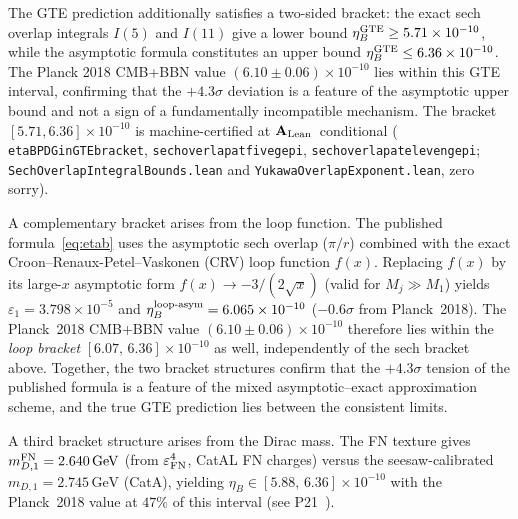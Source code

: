 \documentclass[11pt]{article}
\theoremstyle{remark}
\newcommand{\lean}[1]{%
  \penalty-100
  \begingroup\def\_{\textunderscore\allowbreak}\texttt{#1}\endgroup}
\newcommand{\CatAL}{\ensuremath{\textbf{A}_{\rm Lean}}}
\begin{document}
The GTE prediction additionally satisfies a two-sided bracket:
the exact sech overlap integrals $I(5)$ and $I(11)$ give a lower bound
$\eta_B^{\rm GTE} \geq 5.71 \times 10^{-10}$, while the asymptotic
formula constitutes an upper bound $\eta_B^{\rm GTE} \leq 6.36 \times 10^{-10}$.
The Planck 2018 CMB+BBN value $(6.10 \pm 0.06)\times 10^{-10}$ lies
within this GTE interval, confirming that the $+4.3\sigma$ deviation
is a feature of the asymptotic upper bound and not a sign of a fundamentally
incompatible mechanism.  The bracket $[5.71, 6.36] \times 10^{-10}$
is machine-certified at \CatAL\ conditional
(\lean{eta\_B\_PDG\_in\_GTE\_bracket},
\lean{sech\_overlap\_at\_five\_ge\_pi},
\lean{sech\_overlap\_at\_eleven\_ge\_pi};
\texttt{SechOverlapIntegralBounds.lean} and
\texttt{YukawaOverlapExponent.lean}, zero sorry).

A complementary bracket arises from the loop function.
The published formula~\eqref{eq:etab} uses the asymptotic sech overlap ($\pi/r$)
combined with the exact Croon--Renaux-Petel--Vaskonen (CRV) loop function $f(x)$.
Replacing $f(x)$ by its large-$x$ asymptotic form $f(x)\to -3/(2\sqrt{x})$
(valid for $M_j\gg M_1$) yields $\varepsilon_1 = 3.798\times10^{-5}$ and
$\eta_B^{\rm loop\text{-}asym} = 6.065\times10^{-10}$ ($-0.6\sigma$ from Planck~2018).
The Planck~2018 CMB+BBN value $(6.10\pm0.06)\times10^{-10}$ therefore lies
within the \emph{loop bracket} $[6.07,\,6.36]\times10^{-10}$ as well,
independently of the sech bracket above.
Together, the two bracket structures confirm that the $+4.3\sigma$ tension
of the published formula is a feature of the mixed asymptotic--exact
approximation scheme, and the true GTE prediction lies between the consistent limits.

A third bracket structure arises from the Dirac mass.
The FN texture gives $m_{D,1}^{\rm FN} = 2.640\,\text{GeV}$
(from $\varepsilon_{\rm FN}^4$, CatAL FN charges)
versus the seesaw-calibrated $m_{D,1} = 2.745\,\text{GeV}$ (CatA),
yielding $\eta_B \in [5.88,\,6.36]\times10^{-10}$
with the Planck~2018 value at $47\%$ of this interval (see P21~\cite{SpivackNeutrino}).
\end{document}
